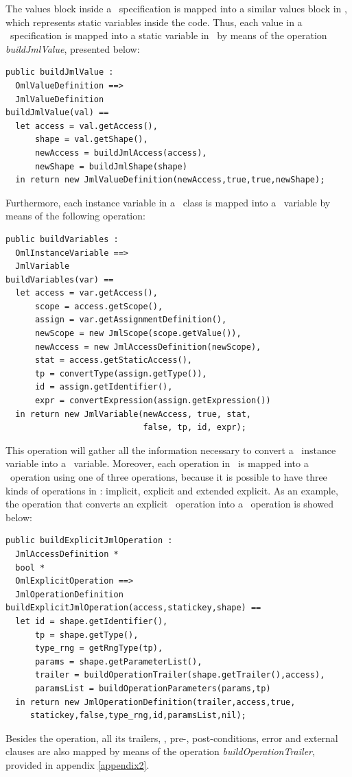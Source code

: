 The values block inside a \vpp\ specification is mapped into a similar values block in \jml, which represents static variables inside the code. Thus, each value in a \vpp\ specification is mapped into a static variable in \jml\ by means of the operation \textit{buildJmlValue}, presented below:

\bigskip
\begin{lstlisting}
public buildJmlValue : 
  OmlValueDefinition ==> 
  JmlValueDefinition
buildJmlValue(val) == 
  let access = val.getAccess(),
      shape = val.getShape(),
      newAccess = buildJmlAccess(access),
      newShape = buildJmlShape(shape)
  in return new JmlValueDefinition(newAccess,true,true,newShape);
\end{lstlisting}
\bigskip

Furthermore, each instance variable in a \vpp\ class is mapped into a \jml\ variable by means of the following operation:
\bigskip
\begin{lstlisting}
public buildVariables : 
  OmlInstanceVariable ==> 
  JmlVariable
buildVariables(var) == 
  let access = var.getAccess(),
      scope = access.getScope(),
      assign = var.getAssignmentDefinition(),
      newScope = new JmlScope(scope.getValue()),
      newAccess = new JmlAccessDefinition(newScope),
      stat = access.getStaticAccess(),
      tp = convertType(assign.getType()),
      id = assign.getIdentifier(),              
      expr = convertExpression(assign.getExpression())
  in return new JmlVariable(newAccess, true, stat, 
                            false, tp, id, expr);
\end{lstlisting}
\bigskip
This operation will gather all the information necessary to convert a \vpp\ instance variable into a \jml\ variable. Moreover, each operation in \vpp\ is mapped into a \jml\ operation using one of three operations, because it is possible to have three kinds of operations in \vpp : implicit, explicit and extended explicit. As an example, the operation that converts an explicit \vpp\ operation into a \jml\ operation is showed below:

\bigskip
\begin{lstlisting}
public buildExplicitJmlOperation : 
  JmlAccessDefinition * 
  bool *
  OmlExplicitOperation ==>
  JmlOperationDefinition
buildExplicitJmlOperation(access,statickey,shape) == 
  let id = shape.getIdentifier(),
      tp = shape.getType(),
      type_rng = getRngType(tp),
      params = shape.getParameterList(),
      trailer = buildOperationTrailer(shape.getTrailer(),access),
      paramsList = buildOperationParameters(params,tp)
  in return new JmlOperationDefinition(trailer,access,true,
     statickey,false,type_rng,id,paramsList,nil);
\end{lstlisting}
\bigskip
Besides the operation, all its trailers, \ie, pre-, post-conditions, error and external clauses are also mapped by means of the operation \textit{buildOperationTrailer}, provided in appendix \ref{appendix2}. 

